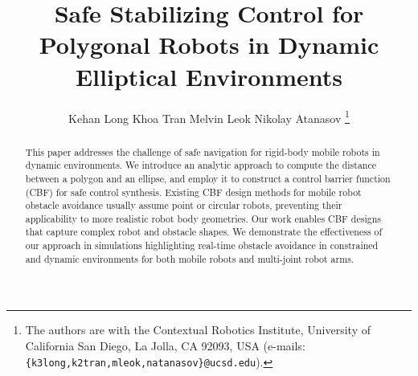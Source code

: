 \documentclass[letterpaper, 10 pt, conference]{cls/ieeeconf}
\title{\LARGE \bf Safe Stabilizing Control for Polygonal Robots in Dynamic Elliptical Environments}
\author{Kehan Long \qquad Khoa Tran \qquad Melvin Leok \qquad Nikolay Atanasov
%  
\thanks{The authors are with the Contextual Robotics Institute, University of California San Diego, La Jolla, CA 92093, USA (e-mails: {\tt\small \{k3long,\allowbreak k2tran,\allowbreak mleok,\allowbreak natanasov\}@ucsd.edu}).}%
}
\theoremstyle{remark}
\theoremstyle{definition}
\theoremstyle{definition}
\begin{document}
\maketitle
\begin{abstract}
This paper addresses the challenge of safe navigation for rigid-body mobile robots in dynamic environments. We introduce an analytic approach to compute the distance between a polygon and an ellipse, and employ it to construct a control barrier function (CBF) for safe control synthesis. Existing CBF design methods for mobile robot obstacle avoidance usually assume point or circular robots, preventing their applicability to more realistic robot body geometries. Our work enables CBF designs that capture complex robot and obstacle shapes. We demonstrate the effectiveness of our approach in simulations highlighting real-time obstacle avoidance in constrained
and dynamic environments for both mobile robots and multi-joint robot arms. 
\end{abstract}


%



%

%







%
%
%
\end{document}
